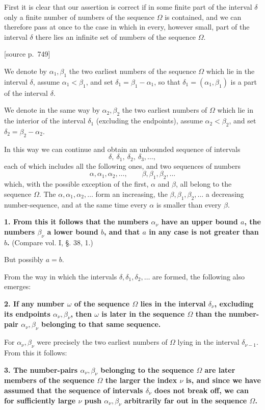\documentclass[11pt]{article}
\newcommand{\srcpage}[1]{\par\medskip\noindent\textsf{[source p.~#1]}\par\smallskip}
\begin{document}
First it is clear that our assertion is correct if in some finite part of the interval $\delta$ only a finite number of numbers of the sequence $\Omega$ is contained, and we can therefore pass at once to the case in which in every, however small, part of the interval $\delta$ there lies an infinite set of numbers of the sequence $\Omega$.

\srcpage{749}
We denote by $\alpha_1,\beta_1$ the two earliest numbers of the sequence $\Omega$ which lie in the interval $\delta$, assume $\alpha_1<\beta_1$, and set $\delta_1=\beta_1-\alpha_1$, so that $\delta_1=(\alpha_1,\beta_1)$ is a part of the interval $\delta$.

We denote in the same way by $\alpha_2,\beta_2$ the two earliest numbers of $\Omega$ which lie in the interior of the interval $\delta_1$ (excluding the endpoints), assume $\alpha_2<\beta_2$, and set $\delta_2=\beta_2-\alpha_2$.

In this way we can continue and obtain an unbounded sequence of intervals
\[
\delta,\ \delta_1,\ \delta_2,\ \delta_3,\ldots,
\]
each of which includes all the following ones, and two sequences of numbers
\[
\alpha,\alpha_1,\alpha_2,\ldots,\qquad
\beta,\beta_1,\beta_2,\ldots
\]
which, with the possible exception of the first, $\alpha$ and $\beta$, all belong to the sequence $\Omega$. The $\alpha,\alpha_1,\alpha_2,\ldots$ form an increasing, the $\beta,\beta_1,\beta_2,\ldots$ a decreasing number-sequence, and at the same time every $\alpha$ is smaller than every $\beta$.

\textbf{1. From this it follows that the numbers $\alpha_\nu$ have an upper bound $a$, the numbers $\beta_\nu$ a lower bound $b$, and that $a$ in any case is not greater than $b$.} (Compare vol. I, §. 38, 1.)

But possibly $a=b$.

From the way in which the intervals $\delta,\delta_1,\delta_2,\ldots$ are formed, the following also emerges:

\textbf{2. If any number $\omega$ of the sequence $\Omega$ lies in the interval $\delta_\nu$, excluding its endpoints $\alpha_\nu,\beta_\nu$, then $\omega$ is later in the sequence $\Omega$ than the number-pair $\alpha_\nu,\beta_\nu$ belonging to that same sequence.}

For $\alpha_\nu,\beta_\nu$ were precisely the two earliest numbers of $\Omega$ lying in the interval $\delta_{\nu-1}$. From this it follows:

\textbf{3. The number-pairs $\alpha_\nu,\beta_\nu$ belonging to the sequence $\Omega$ are later members of the sequence $\Omega$ the larger the index $\nu$ is, and since we have assumed that the sequence of intervals $\delta_\nu$ does not break off, we can for sufficiently large $\nu$ push $\alpha_\nu,\beta_\nu$ arbitrarily far out in the sequence $\Omega$.}
\end{document}

